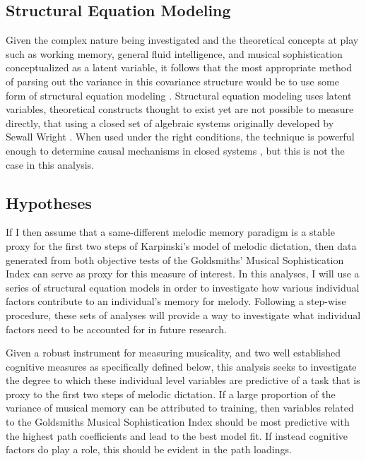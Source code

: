 \documentclass[]{book}
\begin{document}
\hypertarget{structural-equation-modeling}{%
\subsection{Structural Equation Modeling}\label{structural-equation-modeling}}

Given the complex nature being investigated and the theoretical concepts at play such as working memory, general fluid intelligence, and musical sophistication conceptualized as a latent variable, it follows that the most appropriate method of parsing out the variance in this covariance structure would be to use some form of structural equation modeling \citep{beaujeanLatentVariableModeling2014}.
Structural equation modeling uses latent variables, theoretical constructs thought to exist yet are not possible to measure directly, that using a closed set of algebraic systems originally developed by Sewall Wright \citep{wrightMethodPathCoefficents1934}.
When used under the right conditions, the technique is powerful enough to determine causal mechanisms in closed systems \citep{pearlBookWhyNew2018}, but this is not the case in this analysis.

\hypertarget{hypotheses}{%
\subsection{Hypotheses}\label{hypotheses}}

If I then assume that a same-different melodic memory paradigm is a stable proxy for the first two steps of Karpinski's model of melodic dictation, then data generated from both objective tests of the Goldsmiths' Musical Sophistication Index can serve as proxy for this measure of interest.
In this analyses, I will use a series of structural equation models in order to investigate how various individual factors contribute to an individual's memory for melody.
Following a step-wise procedure, these sets of analyses will provide a way to investigate what individual factors need to be accounted for in future research.

Given a robust instrument for measuring musicality, and two well established cognitive measures as specifically defined below, this analysis seeks to investigate the degree to which these individual level variables are predictive of a task that is proxy to the first two steps of melodic dictation.
If a large proportion of the variance of musical memory can be attributed to training, then variables related to the Goldsmiths Musical Sophistication Index should be most predictive with the highest path coefficients and lead to the best model fit.
If instead cognitive factors do play a role, this should be evident in the path loadings.
\end{document}
